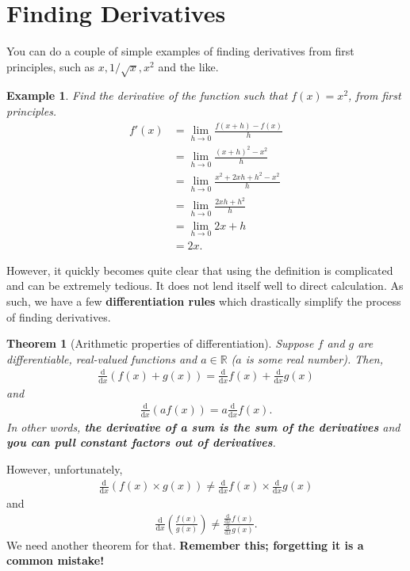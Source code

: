 \documentclass[a4paper,11pt]{article}
\newcommand{\R}{\mathbb{R}}
\newcommand{\diff}[2]{\frac{\mathrm{d}#1}{\mathrm{d}#2}}
\newtheorem*{theorem*}{Theorem}
\newtheorem{example}{Example}
\begin{document}
	\section{Finding Derivatives}
	You can do a couple of simple examples of finding derivatives from first principles, such as $x,1/\sqrt{x},x^2$ and the like.
	
	\begin{example}\normalfont
		Find the derivative of the function such that $f(x)=x^2$, from first principles.
		\begin{align*}
		f'(x) &= \lim\limits_{h\to 0}\frac{f(x+h)-f(x)}{h}\\
		&= \lim\limits_{h\to 0}\frac{(x+h)^2-x^2}{h}\\
		&= \lim\limits_{h\to 0}\frac{x^2+2xh+h^2-x^2}{h}\\
		&= \lim\limits_{h\to 0}\frac{2xh+h^2}{h}\\
		&= \lim\limits_{h\to 0}2x+h\\
		&= 2x.
		\end{align*}
	\end{example}
	
	However, it quickly becomes quite clear that using the definition is complicated and can be extremely tedious. It does not lend itself well to direct calculation. As such, we have a few \textbf{differentiation rules} which drastically simplify the process of finding derivatives.
	
	
	\begin{theorem*}[Arithmetic properties of differentiation]
		Suppose $f$ and $g$ are differentiable, real-valued functions and $a\in\R$ ($a$ is some real number). Then,
		\begin{align*}
		\diff{}{x}\left(f(x)+g(x)\right) = \diff{}{x}f(x)+\diff{}{x}g(x)
		\end{align*}
		and 
		\begin{align*}
		\diff{}{x}\left(af(x)\right) = a\diff{}{x}f(x).
		\end{align*}
		In other words, \textbf{the derivative of a sum is the sum of the derivatives} and \textbf{you can pull constant factors out of derivatives}.
	\end{theorem*}

	\noindent However, unfortunately, 
		\begin{align*}
		\diff{}{x}\left(f(x)\times g(x)\right)\neq\diff{}{x}f(x)\times\diff{}{x}g(x)
		\end{align*}
		and
		\begin{align*}
		\diff{}{x}\left(\frac{f(x)}{g(x)}\right)\neq\frac{\diff{}{x}f(x)}{\diff{}{x}g(x)}.
		\end{align*}
	We need another theorem for that. \textbf{Remember this; forgetting it is a common mistake!}\\
\end{document}

